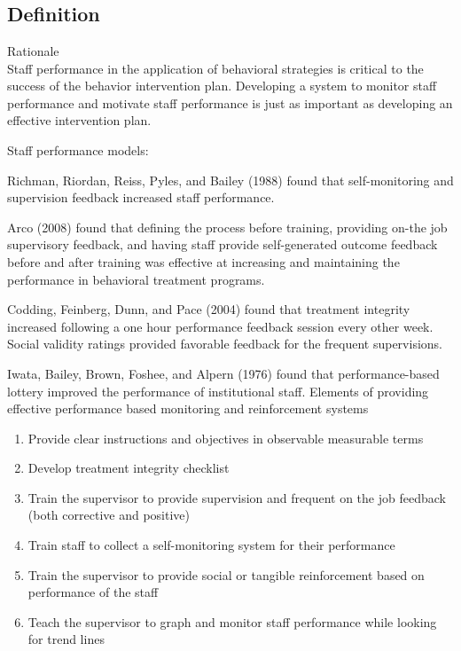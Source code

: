 \section[\fourkFour{}]{\fourkFour{}%
              }
\subsection{Definition}
Rationale\\
Staff performance in the application of behavioral strategies is critical to the success of the behavior intervention plan.  Developing a system to monitor staff performance and motivate staff performance is just as important as developing an effective intervention plan.  

Staff performance models:

Richman, Riordan, Reiss, Pyles, and Bailey (1988) found that self-monitoring and supervision feedback increased staff performance.

Arco (2008) found that defining the process before training, providing on-the job supervisory feedback, and having staff provide self-generated outcome feedback before and after training was effective at increasing and maintaining the performance in behavioral treatment programs.  

Codding, Feinberg, Dunn, and Pace (2004) found that treatment integrity increased following a one hour performance feedback session every other week.  Social validity ratings provided favorable feedback for the frequent supervisions.  

Iwata, Bailey, Brown, Foshee, and Alpern (1976) found that performance-based lottery improved the performance of institutional staff.
%
Elements of providing effective performance based monitoring and reinforcement systems
\begin{enumerate}
\item Provide clear instructions and objectives in observable measurable terms
\item Develop treatment integrity checklist
\item Train the supervisor to provide supervision and frequent on the job feedback (both corrective and positive)
\item Train staff to collect a self-monitoring system for their performance 
\item Train the supervisor to provide social or tangible reinforcement based on performance of the staff
\item Teach the supervisor to graph and monitor staff performance while looking for trend lines
\end{enumerate}
%
